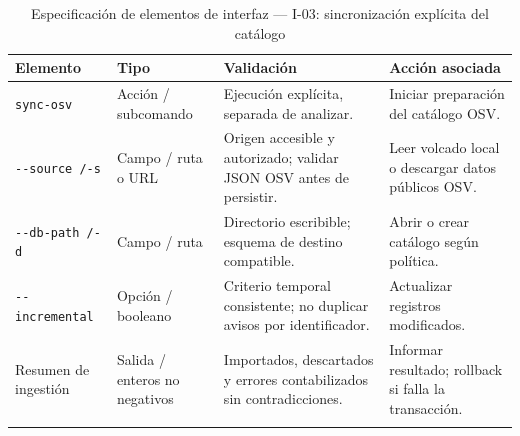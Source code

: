 \begin{table}[H]
\centering\small{}
\caption{Especificación de elementos de interfaz --- I-03: sincronización explícita del catálogo}
\begin{tabularx}{\textwidth}{P{3.0cm}P{2.3cm}YY}
\toprule
\textbf{Elemento} & \textbf{Tipo} & \textbf{Validación} & \textbf{Acción asociada} \\
\midrule
\texttt{sync-\allowbreak osv} & Acción / subcomando & Ejecución explícita, separada de analizar. & Iniciar preparación del catálogo OSV. \\
\addlinespace
\texttt{-\allowbreak -\allowbreak source /\allowbreak  -\allowbreak s} & Campo / ruta o URL & Origen accesible y autorizado; validar JSON OSV antes de persistir. & Leer volcado local o descargar datos públicos OSV. \\
\addlinespace
\texttt{-\allowbreak -\allowbreak db-\allowbreak path /\allowbreak  -\allowbreak d} & Campo / ruta & Directorio escribible; esquema de destino compatible. & Abrir o crear catálogo según política. \\
\addlinespace
\texttt{-\allowbreak -\allowbreak incremental} & Opción / booleano & Criterio temporal consistente; no duplicar avisos por identificador. & Actualizar registros modificados. \\
\addlinespace
Resumen de ingestión & Salida / enteros no negativos & Importados, descartados y errores contabilizados sin contradicciones. & Informar resultado; rollback si falla la transacción. \\
\addlinespace
\bottomrule
\end{tabularx}
\end{table}


